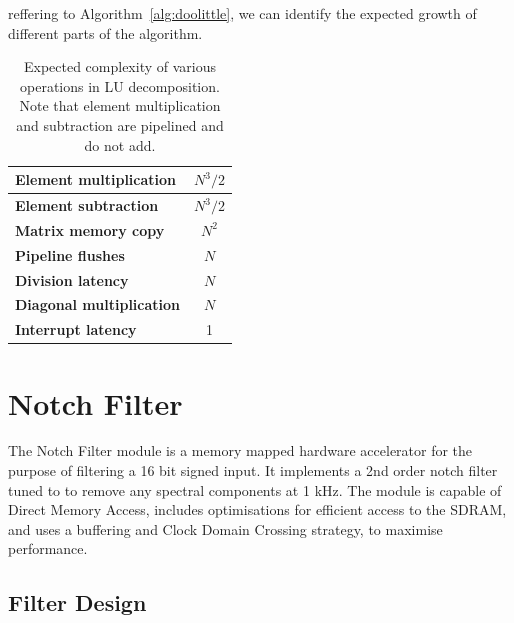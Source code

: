 \documentclass[]{article}
\begin{document}
reffering to Algorithm~\ref{alg:doolittle}, we can identify the expected growth of different parts of the algorithm.

\begin{table}[htbp]
	\caption{Expected complexity of various operations in LU decomposition. Note that element multiplication and subtraction are pipelined and do not add.}
	\label{tab:expected_complexity}
	\begin{center}
		\begin{tabular}{l|c}
		\hline

		\hline
			\textbf{Element multiplication} 	& $N^3/2$ \\
		\hline
			\textbf{Element subtraction} 		& $N^3/2$ \\
		\hline
			\textbf{Matrix memory copy} 		& $N^2$ \\
		\hline
			\textbf{Pipeline flushes} 			& $N$ \\
		\hline
			\textbf{Division latency} 			& $N$ \\
		\hline
			\textbf{Diagonal multiplication} 	& $N$ \\
		\hline
			\textbf{Interrupt latency}			& 1 \\
		\hline
		
		\hline
		\end{tabular}
	\end{center}
\end{table}




\clearpage


\section{Notch Filter} %
\label{sec:notch_filter}

The Notch Filter module is a memory mapped hardware accelerator for the purpose of filtering a 16 bit signed input. It implements a 2nd order notch filter tuned to to remove any spectral components at 1 kHz.
The module is capable of Direct Memory Access, includes optimisations for efficient access to the SDRAM, and uses a buffering and Clock Domain Crossing strategy, to maximise performance.

\subsection{Filter Design} %
\label{sub:filter_design}
\end{document}
